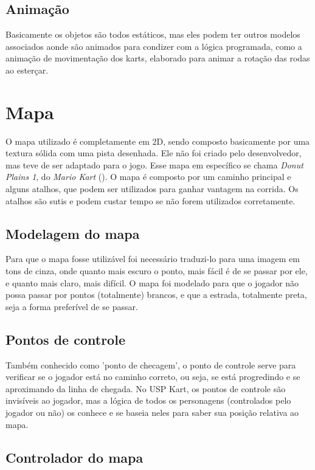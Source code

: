 \subsection{Animação}

Basicamente os objetos são todos estáticos, mas eles podem ter outros modelos associados aonde são animados para condizer com a lógica programada, como a animação de movimentação dos karts, elaborado para animar a rotação das rodas ao esterçar.

\section{Mapa}

O mapa utilizado é completamente em 2D, sendo composto basicamente por uma textura sólida com uma pista desenhada. Ele não foi criado pelo desenvolvedor, mas teve de ser adaptado para o jogo. Esse mapa em específico se chama \textit{Donut Plains 1}, do \textit{Mario Kart} (\cite{marioKart}). O mapa é composto por um caminho principal e alguns atalhos, que podem ser utilizados para ganhar vantagem na corrida. Os atalhos são sutis e podem custar tempo se não forem utilizados corretamente.

\subsection{Modelagem do mapa}

Para que o mapa fosse utilizável foi necessário traduzi-lo para uma imagem em tons de cinza, onde quanto mais escuro o ponto, mais fácil é de se passar por ele, e quanto mais claro, mais difícil. O mapa foi modelado para que o jogador não possa passar por pontos (totalmente) brancos, e que a estrada, totalmente preta, seja a forma preferível de se passar.
\subsection{Pontos de controle}

Também conhecido como 'ponto de checagem', o ponto de controle serve para verificar se o jogador está no caminho correto, ou seja, se está progredindo e se aproximando da linha de chegada. No USP Kart, os pontos de controle são invisíveis ao jogador, mas a lógica de todos os personagens (controlados pelo jogador ou não) os conhece e se baseia neles para saber sua posição relativa ao mapa.

\subsection{Controlador do mapa}\label{sec:controlador-do-mapa}

